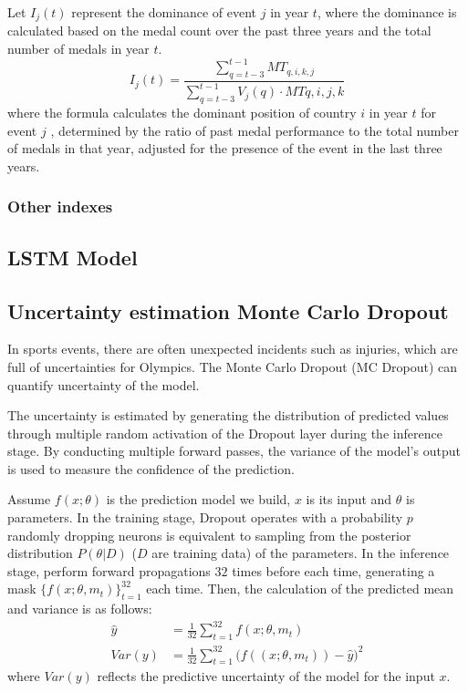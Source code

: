 \documentclass{mcmthesis}
\begin{document}
Let \( I_j(t) \) represent the dominance of event \( j \) in year \( t \), where the dominance is calculated based on the medal count over the past three years and the total number of medals in year \( t \).
\[
I_j(t) = \frac{\sum_{q=t-3}^{t-1} MT_{q,i,k,j}}{\sum_{q=t-3}^{t-1}V_j(q) \cdot MT{q,i,j,k}} 
\]
where the formula calculates the dominant position of country $i$ in year  $t$  for event  $j$ , determined by the ratio of past medal performance to the total number of medals in that year, adjusted for the presence of the event in the last three years.







\subsubsection{Other indexes}




\subsection{LSTM Model}

\subsection{Uncertainty estimation Monte Carlo Dropout}


In sports events, there are often unexpected incidents such as injuries, which are full of uncertainties for Olympics. The Monte Carlo Dropout (MC Dropout) can quantify uncertainty of the model.

The uncertainty is estimated by generating the distribution of predicted values through multiple random activation of the Dropout layer during the inference stage. By conducting multiple forward passes, the variance of the model's output is used to measure the confidence of the prediction.

Assume $f(x;\theta)$ is the prediction model we build, $x$ is its input and $\theta$ is parameters. In the training stage, Dropout operates with a probability $p$
randomly dropping neurons is equivalent to sampling from the posterior distribution $P(\theta|D)$ ($D$ are training data) of the parameters. In the inference stage, perform forward propagations $32$ times before each time, generating a mask $\{f(x;\theta,m_t)\}_{t=1}^{32}$ each time. Then, the calculation of the predicted mean and variance is as follows:
\begin{align*}
\hat{y}&=\frac{1}{32} \sum_{t=1}^{32} f(x;\theta,m_t) \\
Var(y) &=\frac{1}{32} \sum_{t=1}^{32} \big( f((x;\theta,m_t)) - \hat{y} \big)^2
\end{align*}
where $Var(y)$ reflects the predictive uncertainty of the model for the input $x$.
\end{document}
